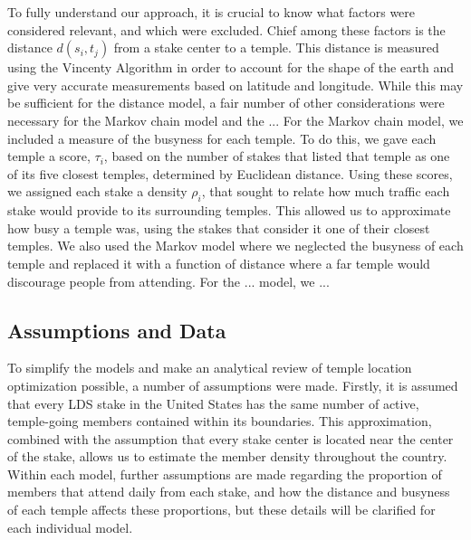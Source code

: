 \documentclass[twoside,twocolumn]{article}
\begin{document}

\noindent To fully understand our approach, it is crucial to know what factors were considered relevant, and which were excluded. %
Chief among these factors is the distance $d(s_{i},t_{j})$ from a stake center to a temple.
This distance is measured using the Vincenty Algorithm in order to account for the shape of the earth and give very accurate measurements based on latitude and longitude.
While this may be sufficient for the distance model, a fair number of other considerations were necessary for the Markov chain model and the ...
For the Markov chain model, we included a measure of the busyness for each temple.
To do this, we gave each temple a score, $\tau_{i}$, based on the number of stakes that listed that temple as one of its five closest temples, determined by Euclidean distance.
Using these scores, we assigned each stake a density $\rho_{i}$, that sought to relate how much traffic each stake would provide to its surrounding temples.
This allowed us to approximate how busy a temple was, using the stakes that consider it one of their closest temples.
We also used the Markov model where we neglected the busyness of each temple and replaced it with a function of distance where a far temple would discourage people from attending. %
For the ... model, we ...

\subsection{Assumptions and Data}
To simplify the models and make an analytical review of temple location optimization possible, a number of assumptions were made.
Firstly, it is assumed that every LDS stake in the United States has the same number of active, temple-going members contained within its boundaries.
This approximation, combined with the assumption that every stake center is located near the center of the stake, allows us to estimate the member density throughout the country.
Within each model, further assumptions are made regarding the proportion of members that attend daily from each stake, and how the distance and busyness of each temple affects these proportions, but these details will be clarified for each individual model.
\end{document}
